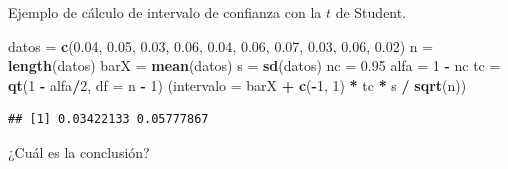 \documentclass[
  9pt,
  ignorenonframetext,
]{beamer}
\newenvironment{Shaded}{\begin{snugshade}}{\end{snugshade}}
\newcommand{\DataTypeTok}[1]{\textcolor[rgb]{0.13,0.29,0.53}{#1}}
\newcommand{\DecValTok}[1]{\textcolor[rgb]{0.00,0.00,0.81}{#1}}
\newcommand{\FloatTok}[1]{\textcolor[rgb]{0.00,0.00,0.81}{#1}}
\newcommand{\KeywordTok}[1]{\textcolor[rgb]{0.13,0.29,0.53}{\textbf{#1}}}
\newcommand{\NormalTok}[1]{#1}
\newcommand{\OperatorTok}[1]{\textcolor[rgb]{0.81,0.36,0.00}{\textbf{#1}}}
\newcommand{\StringTok}[1]{\textcolor[rgb]{0.31,0.60,0.02}{#1}}
\begin{document}
\begin{frame}[fragile]{Ejemplo de cálculo de intervalo de confianza con
la \(t\) de Student.}
\begin{itemize}
\begin{Shaded}
\begin{Highlighting}[]
\NormalTok{datos =}\StringTok{ }\KeywordTok{c}\NormalTok{(}\FloatTok{0.04}\NormalTok{, }\FloatTok{0.05}\NormalTok{, }\FloatTok{0.03}\NormalTok{, }\FloatTok{0.06}\NormalTok{, }\FloatTok{0.04}\NormalTok{, }\FloatTok{0.06}\NormalTok{, }\FloatTok{0.07}\NormalTok{, }\FloatTok{0.03}\NormalTok{, }\FloatTok{0.06}\NormalTok{, }\FloatTok{0.02}\NormalTok{)}
\NormalTok{n =}\StringTok{ }\KeywordTok{length}\NormalTok{(datos)}
\NormalTok{barX =}\StringTok{ }\KeywordTok{mean}\NormalTok{(datos)}
\NormalTok{s =}\StringTok{ }\KeywordTok{sd}\NormalTok{(datos)}
\NormalTok{nc =}\StringTok{ }\FloatTok{0.95}
\NormalTok{alfa =}\StringTok{ }\DecValTok{1} \OperatorTok{-}\StringTok{ }\NormalTok{nc}
\NormalTok{tc =}\StringTok{ }\KeywordTok{qt}\NormalTok{(}\DecValTok{1} \OperatorTok{-}\StringTok{ }\NormalTok{alfa}\OperatorTok{/}\DecValTok{2}\NormalTok{, }\DataTypeTok{df =}\NormalTok{ n }\OperatorTok{-}\StringTok{ }\DecValTok{1}\NormalTok{)}
\NormalTok{(}\DataTypeTok{intervalo =}\NormalTok{ barX }\OperatorTok{+}\StringTok{ }\KeywordTok{c}\NormalTok{(}\OperatorTok{-}\DecValTok{1}\NormalTok{, }\DecValTok{1}\NormalTok{) }\OperatorTok{*}\StringTok{ }\NormalTok{tc }\OperatorTok{*}\StringTok{ }\NormalTok{s }\OperatorTok{/}\StringTok{ }\KeywordTok{sqrt}\NormalTok{(n))}
\end{Highlighting}
\end{Shaded}

\begin{verbatim}
## [1] 0.03422133 0.05777867
\end{verbatim}

  \normalsize

  ¿Cuál es la conclusión?
\end{itemize}

\end{frame}
\end{document}

